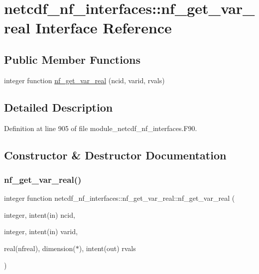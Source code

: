 \hypertarget{interfacenetcdf__nf__interfaces_1_1nf__get__var__real}{}\section{netcdf\+\_\+nf\+\_\+interfaces\+:\+:nf\+\_\+get\+\_\+var\+\_\+real Interface Reference}
\label{interfacenetcdf__nf__interfaces_1_1nf__get__var__real}
\subsection*{Public Member Functions}
\begin{DoxyCompactItemize}
\item 
integer function \hyperlink{interfacenetcdf__nf__interfaces_1_1nf__get__var__real_a5fa35678919fef57231174a904197e43}{nf\+\_\+get\+\_\+var\+\_\+real} (ncid, varid, rvals)
\end{DoxyCompactItemize}


\subsection{Detailed Description}


Definition at line 905 of file module\+\_\+netcdf\+\_\+nf\+\_\+interfaces.\+F90.



\subsection{Constructor \& Destructor Documentation}
\mbox{\label{interfacenetcdf__nf__interfaces_1_1nf__get__var__real_a5fa35678919fef57231174a904197e43}} 
\subsubsection{\texorpdfstring{nf\+\_\+get\+\_\+var\+\_\+real()}{nf\_get\_var\_real()}}
{\footnotesize\ttfamily integer function netcdf\+\_\+nf\+\_\+interfaces\+::nf\+\_\+get\+\_\+var\+\_\+real\+::nf\+\_\+get\+\_\+var\+\_\+real (\begin{DoxyParamCaption}\item[{integer, intent(in)}]{ncid,  }\item[{integer, intent(in)}]{varid,  }\item[{real(nfreal), dimension($\ast$), intent(out)}]{rvals }\end{DoxyParamCaption})}



